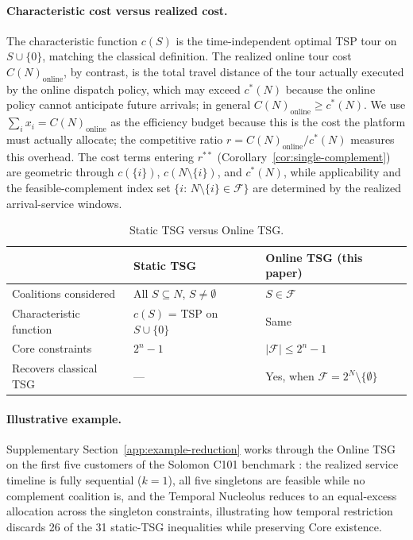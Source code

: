 \documentclass[11pt]{article}
\theoremstyle{plain}
\theoremstyle{definition}
\theoremstyle{remark}
\newcommand{\F}{\mathcal{F}}
\newcommand{\cstar}{c^{\ast}}
\begin{document}
\paragraph{Characteristic cost versus realized cost.} The characteristic function $c(S)$ is the time-independent optimal TSP tour on $S\cup\{0\}$, matching the classical \citet{potters1992tsg} definition. The realized online tour cost $C(N)_{\text{online}}$, by contrast, is the total travel distance of the tour actually executed by the online dispatch policy, which may exceed $\cstar(N)$ because the online policy cannot anticipate future arrivals; in general $C(N)_{\text{online}} \ge \cstar(N)$. We use $\sum_i x_i = C(N)_{\text{online}}$ as the efficiency budget because this is the cost the platform must actually allocate; the competitive ratio $r = C(N)_{\text{online}}/\cstar(N)$ measures this overhead. The cost terms entering $r^{\ast\ast}$ (Corollary~\ref{cor:single-complement}) are geometric through $c(\{i\})$, $c(N\setminus\{i\})$, and $\cstar(N)$, while applicability and the feasible-complement index set $\{i:\,N\setminus\{i\}\in\F\}$ are determined by the realized arrival-service windows.

\begin{table}[t]
\centering
\caption{Static TSG versus Online TSG.}
\label{tab:static-vs-temporal}
\small
\begin{tabular}{@{}lll@{}}
\toprule
 & Static TSG \citep{potters1992tsg} & Online TSG (this paper) \\
\midrule
Coalitions considered & All $S\subseteq N$, $S\neq\emptyset$ & $S\in\F$ \\
Characteristic function & $c(S)$ = TSP on $S\cup\{0\}$ & Same \\
Core constraints & $2^n-1$ & $|\F|\le 2^n-1$ \\
Recovers classical TSG & --- & Yes, when $\F=2^N\setminus\{\emptyset\}$ \\
\bottomrule
\end{tabular}
\end{table}

\paragraph{Illustrative example.} Supplementary Section~\ref{app:example-reduction} works through the Online TSG on the first five customers of the Solomon C101 benchmark \citep{solomon1987benchmarks}: the realized service timeline is fully sequential ($k=1$), all five singletons are feasible while no complement coalition is, and the Temporal Nucleolus reduces to an equal-excess allocation across the singleton constraints, illustrating how temporal restriction discards 26 of the 31 static-TSG inequalities while preserving Core existence.
\end{document}
